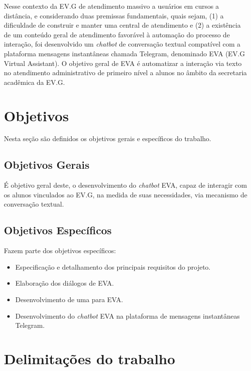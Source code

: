 Nesse contexto da EV.G de atendimento massivo a usuários em cursos a distância, e considerando duas premissas fundamentais, quais sejam, (1) a dificuldade de construir e manter uma central de atendimento e (2) a existência de um conteúdo geral de atendimento favorável à automação do processo de interação, foi desenvolvido um \textit{chatbot} de conversação textual compatível com a plataforma mensagens instantâneas chamada Telegram, denominado EVA (EV.G Virtual Assistant). O objetivo geral de EVA é automatizar a interação via texto no atendimento administrativo de primeiro nível a alunos no âmbito da secretaria acadêmica da EV.G.


\section{Objetivos}\label{cap:01:sec:01:objetivos}

Nesta seção são definidos os objetivos gerais e específicos do trabalho.


\subsection{Objetivos Gerais}\label{cap:01:sec:01:sub:01:objetivo-geral}

É objetivo geral deste, o desenvolvimento do \textit{chatbot} EVA, capaz de interagir com os alunos vinculados ao EV.G, na medida de suas necessidades, via mecanismo de conversação textual.


\subsection{Objetivos Específicos}\label{cap:01:sec:01:sub:02:ojetivos-especificos}

Fazem parte dos objetivos específicos:

\begin{itemize}
    \item Especificação e detalhamento dos principais requisitos do projeto.
    \item Elaboração dos diálogos de EVA.
    \item Desenvolvimento de uma  para EVA.
    \item Desenvolvimento do \textit{chatbot} EVA na plataforma de mensagens instantâneas Telegram.
\end{itemize}


\section{Delimitações do trabalho}\label{cap:01:sec:03:delimitacao}

